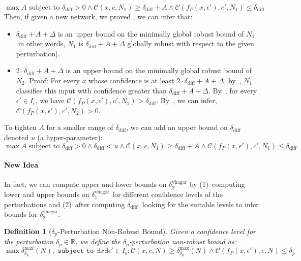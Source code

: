\documentclass[11pt]{article}
\newtheorem{definition}{Definition}
\begin{document}
\begin{equation}\label{eq:ourproof}
 \max A \text{ subject to } \delta_\text{diff}>0\land \mathcal{C}(x,c,N_1) \geq \delta_\text{diff} + A\land \mathcal{C}(f_P(x,\epsilon'),c',N_1)\leq \delta_\text{diff}
 \end{equation}
  Then, if given a new network, we proved , we can infer that:
  \begin{itemize}
    \item $ \delta_\text{diff} +A+\Delta$ is an upper bound on the minimally global robust bound of $N_1$ [in other words, $N_1$ is $ \delta_\text{diff} +A+\Delta$ globally robust with respect to the given perturbation].
    \item $ 2\cdot \delta_\text{diff} +A+\Delta$ is an upper bound on the minimally global robust bound of $N_2$. Proof:
    For every $x$ whose confidence is at least $2\cdot \delta_\text{diff} +A+\Delta$, by~, $N_1$ classifies this input with confidence greater than $\delta_\text{diff} +A+\Delta$. By~, for every $\epsilon'\in I_\epsilon$, we have $\mathcal{C}(f_P(x,\epsilon'),c',N_1)>\delta_\text{diff}$. By~, we can infer, $\mathcal{C}(f_P(x,\epsilon'),c',N_2)>0$. 
  \end{itemize}
  To tighten $A$ for a smaller range of $\delta_\text{diff}$, we can add an upper bound on $\delta_\text{diff}$ denoted $u$ (a hyper-parameter):
  \begin{equation}\label{eq:ourproof}
 \max A \text{ subject to } \delta_\text{diff}>0\land \delta_\text{diff}<u\land \mathcal{C}(x,c,N_1) \geq \delta_\text{diff} + A\land \mathcal{C}(f_P(x,\epsilon'),c',N_1)\leq \delta_\text{diff}
 \end{equation}
 \paragraph{New Idea}
 In fact, we can compute upper and lower bounds on $\delta^\text{vhagar}_2$ by (1)~computing lower and upper bounds on  $\delta^\text{vhagar}_1$ for different confidence levels of the perturbations and (2)~after computing $\delta_\text{diff}$, looking for the suitable levels to infer bounds for $\delta^\text{vhagar}_2$.
 \begin{definition}[$\delta_p$-Perturbation Non-Robust Bound]\label{def:delta_u}
 Given a confidence level for the perturbation $\delta_p\in\mathbb{R}$, we define the $\delta_p$-perturbation non-robust bound as:  
\begin{equation}\label{eq:vagbound}
\max{\delta^\text{max}_{\delta_p}(N)}, \texttt{ subject to } \exists{x}\exists{\epsilon'}\in{I_\epsilon}: \mathcal{C}(x,c,N) \geq \delta^\text{max}_{\delta_p}(N) \land \mathcal{C}(f_P(x,\epsilon'),c,N)\leq \delta_p
\end{equation}
\end{definition}
\end{document}
